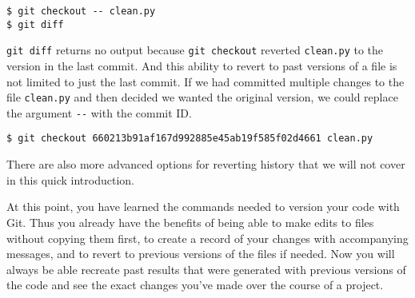\begin{lstlisting}
$ git checkout -- clean.py
$ git diff
\end{lstlisting}

\verb|git diff| returns no output because \verb|git checkout| reverted \verb|clean.py| to the version in the last commit.
And this ability to revert to past versions of a file is not limited to just the last commit.
If we had committed multiple changes to the file \verb|clean.py| and then decided we wanted the original version, we could replace the argument \verb|--| with the commit ID.

\begin{lstlisting}
$ git checkout 660213b91af167d992885e45ab19f585f02d4661 clean.py
\end{lstlisting}

There are also more advanced options for reverting history that we will not cover in this quick introduction.

At this point, you have learned the commands needed to version your code with Git.
Thus you already have the benefits of being able to make edits to files without copying them first, to create a record of your changes with accompanying messages, and to revert to previous versions of the files if needed.
Now you will always be able recreate past results that were generated with previous versions of the code and see the exact changes you've made over the course of a project.